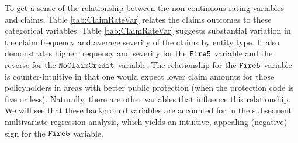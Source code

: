 \documentclass[]{book}
\theoremstyle{definition}
\theoremstyle{definition}
\theoremstyle{definition}
\theoremstyle{remark}
\begin{document}
To get a sense of the relationship between the non-continuous rating
variables and claims, Table \ref{tab:ClaimRateVar} relates the claims
outcomes to these categorical variables. Table \ref{tab:ClaimRateVar}
suggests substantial variation in the claim frequency and average
severity of the claims by entity type. It also demonstrates higher
frequency and severity for the \({\tt Fire5}\) variable and the reverse
for the \({\tt NoClaimCredit}\) variable. The relationship for the
\({\tt Fire5}\) variable is counter-intuitive in that one would expect
lower claim amounts for those policyholders in areas with better public
protection (when the protection code is five or less). Naturally, there
are other variables that influence this relationship. We will see that
these background variables are accounted for in the subsequent
multivariate regression analysis, which yields an intuitive, appealing
(negative) sign for the \({\tt Fire5}\) variable.
\end{document}
